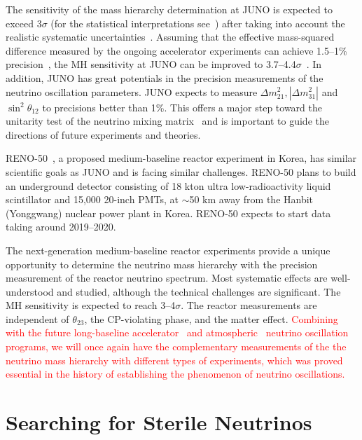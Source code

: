 \documentclass[aps,twocolumn,preprintnumbers,amsmath,superscriptaddress,amssymb,floats,nofootinbib]{revtex4-1}
\begin{document}
The sensitivity of the mass hierarchy determination at JUNO is expected to exceed 3$\sigma$ (for the statistical interpretations see~\cite{Qian-Stat,Blennow}) after taking into account the realistic systematic uncertainties~\cite{Li-PRD13,MBRwitepaper}. 
Assuming that the effective mass-squared difference measured by the ongoing accelerator experiments can achieve 1.5--1\% precision~\cite{Agarwalla}, the MH sensitivity at JUNO can be improved to 3.7--4.4$\sigma$~\cite{Li-PRD13}. 
In addition, JUNO has great potentials in the precision measurements of the neutrino oscillation parameters. JUNO expects to measure $\Delta m^2_{21}, |\Delta m^2_{31}|$ and $\sin^2 \theta_{12}$ to precisions better than 1\%. This offers a major step toward the unitarity test of the neutrino mixing matrix~\cite{unitarity13} and is important to guide the directions of future experiments and theories. 

RENO-50~\cite{RENO-50}, a proposed medium-baseline reactor experiment in Korea, has similar scientific goals as JUNO and is facing similar challenges. RENO-50 plans to build an underground detector consisting of 18 kton ultra low-radioactivity liquid scintillator and 15,000 20-inch PMTs, at $\sim$50 km away from the Hanbit (Yonggwang) nuclear power plant in Korea. RENO-50 expects to start data taking around 2019--2020.

The next-generation medium-baseline reactor experiments provide a unique opportunity to determine the neutrino mass hierarchy with the precision measurement of the reactor neutrino spectrum.
Most systematic effects are well-understood and studied, although the technical challenges are significant. 
The MH sensitivity is expected to reach 3--4$\sigma$.
The reactor measurements are independent of $\theta_{23}$, the CP-violating phase, and the matter effect.
\textcolor{red}{Combining with the future long-baseline accelerator~\cite{LBNE} and atmospheric~\cite{PINGU,ORCA} neutrino oscillation programs, we will once again have the complementary measurements of the the neutrino mass hierarchy with different types of experiments, which was proved essential in the history of establishing the phenomenon of neutrino oscillations.}


\section{Searching for Sterile Neutrinos}
\end{document}
